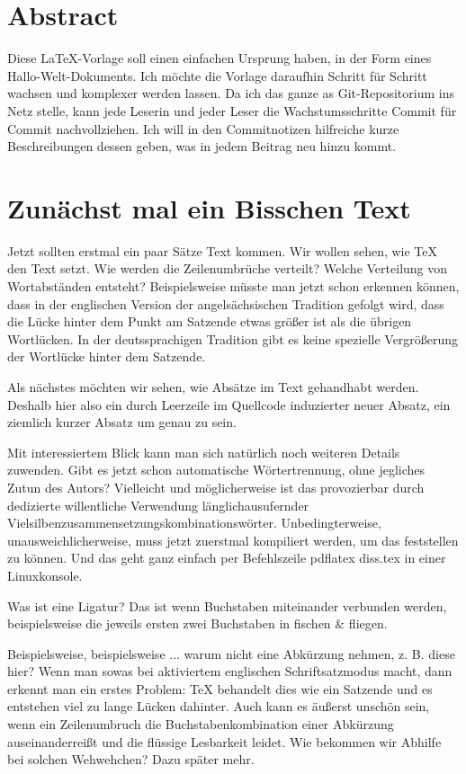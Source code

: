 \documentclass[11pt,a4paper,twoside,titlepage]{book}
\begin{document}
\frontmatter
\chapter{Abstract}%
Diese LaTeX-Vorlage soll einen einfachen Ursprung haben, in der Form eines Hallo-Welt-Dokuments. Ich möchte die Vorlage daraufhin Schritt für Schritt wachsen und komplexer werden lassen. Da ich das ganze as Git-Repositorium ins Netz stelle, kann jede Leserin und jeder Leser die Wachstumsschritte Commit für Commit nachvollziehen. Ich will in den Commitnotizen hilfreiche kurze Beschreibungen dessen geben, was in jedem Beitrag neu hinzu kommt.

\mainmatter
\chapter{Zunächst mal ein Bisschen Text}%
Jetzt sollten erstmal ein paar Sätze Text kommen. Wir wollen sehen, wie TeX den Text setzt. Wie werden die Zeilenumbrüche verteilt? Welche Verteilung von Wortabständen entsteht? Beispielsweise müsste man jetzt schon erkennen können, dass in der englischen Version der angelsächsischen Tradition gefolgt wird, dass die Lücke hinter dem Punkt am Satzende etwas größer ist als die übrigen Wortlücken. In der deutssprachigen Tradition gibt es keine spezielle Vergrößerung der Wortlücke hinter dem Satzende.

Als nächstes möchten wir sehen, wie Absätze im Text gehandhabt werden. Deshalb hier also ein durch Leerzeile im Quellcode induzierter neuer Absatz, ein ziemlich kurzer Absatz um genau zu sein.

Mit interessiertem Blick kann man sich natürlich noch weiteren Details zuwenden. Gibt es jetzt schon automatische Wörtertrennung, ohne jegliches Zutun des Autors? Vielleicht und möglicherweise ist das provozierbar durch dedizierte willentliche Verwendung länglichausufernder Vielsilbenzusammensetzungskombinationswörter. Unbedingterweise, unausweichlicherweise, muss jetzt zuerstmal kompiliert werden, um das feststellen zu können. Und das geht ganz einfach per Befehlszeile \glqq pdflatex diss.tex\grqq{} in einer Linuxkonsole.

Was ist eine Ligatur? Das ist wenn Buchstaben miteinander verbunden werden, beispielsweise die jeweils ersten zwei Buchstaben in \glqq fischen\grqq{} \& \glqq fliegen\grqq{}.

Beispielsweise, beispielsweise ... warum nicht eine Abkürzung nehmen, z. B. diese hier? Wenn man sowas bei aktiviertem englischen Schriftsatzmodus macht, dann erkennt man ein erstes Problem: TeX behandelt dies wie ein Satzende und es entstehen viel zu lange Lücken dahinter. Auch kann es äußerst unschön sein, wenn ein Zeilenumbruch die Buchstabenkombination einer Abkürzung auseinanderreißt und die flüssige Lesbarkeit leidet. Wie bekommen wir Abhilfe bei solchen Wehwehchen? Dazu später mehr.
\end{document}

